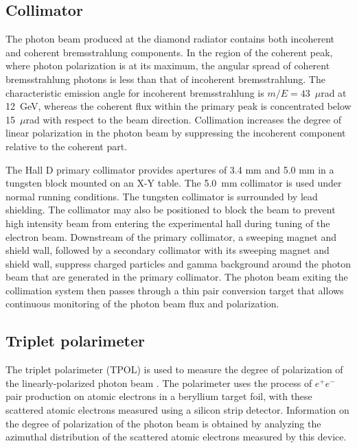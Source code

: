 \subsection{Collimator}
The photon beam produced at the diamond radiator contains both incoherent
and coherent bremsstrahlung components. In the region of the coherent peak,
where photon polarization is at its maximum, the angular spread of coherent
bremsstrahlung photons is less than that of incoherent bremsstrahlung.
The characteristic emission angle for incoherent bremsstrahlung is
$m/E = 43$~$\mu$rad at 12~GeV, whereas the coherent flux within the
primary peak is concentrated below 15~$\mu$rad with respect to the beam
direction. Collimation increases the degree of linear polarization in
the photon beam by suppressing the incoherent component relative to the
coherent part.

The Hall D primary collimator provides apertures of 3.4 mm and 5.0 mm in a
tungsten block mounted on an X-Y table. The 5.0~mm collimator is used
under normal \GX{} running conditions.
The tungsten collimator is surrounded by lead shielding.
The collimator may also be positioned to block the beam to prevent
high intensity beam from entering the experimental hall during tuning
of the electron beam. Downstream of the primary collimator, a
sweeping magnet and shield wall, followed by a secondary collimator
with its sweeping magnet and shield wall, suppress charged
particles and gamma background around the photon beam that are
generated in the primary collimator. The photon beam exiting the
collimation system then passes through a thin pair conversion target
that allows continuous monitoring of the photon beam flux and polarization.

\subsection{Triplet polarimeter \label{sec:tpol}}
The triplet polarimeter (TPOL) is used to measure the degree of polarization
of the linearly-polarized photon beam \cite{DUGGER2017115}.
The polarimeter uses the process of $e^+e^-$ pair production on atomic electrons 
in a beryllium target foil, with these scattered atomic electrons
measured using a silicon strip detector.
Information on the degree of polarization of the photon beam is
obtained by analyzing the azimuthal distribution of the scattered
atomic electrons measured by this device.

